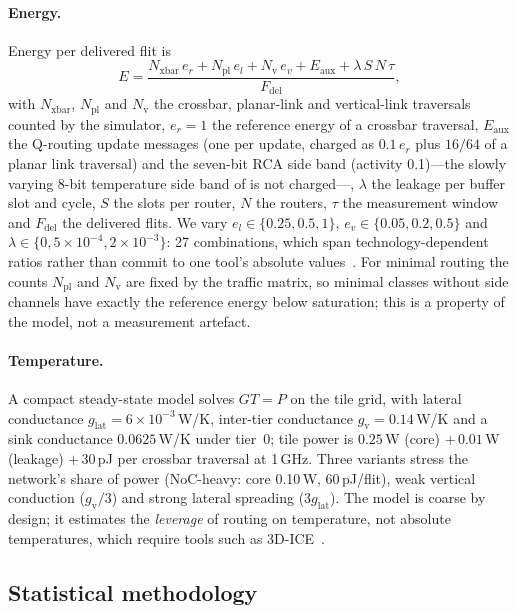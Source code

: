 \paragraph{Energy.} Energy per delivered flit is
\begin{equation}\label{eq:energy}
E=\frac{N_{\mathrm{xbar}}\,e_r+N_{\mathrm{pl}}\,e_l+N_{\mathrm{v}}\,e_v+E_{\mathrm{aux}}+\lambda\,S\,N\,\tau}{F_{\mathrm{del}}},
\end{equation}
with $N_{\mathrm{xbar}}$, $N_{\mathrm{pl}}$ and $N_{\mathrm{v}}$ the crossbar, planar-link and vertical-link traversals counted by the simulator, $e_r=1$ the reference energy of a crossbar traversal, $E_{\mathrm{aux}}$ the Q-routing update messages (one per update, charged as $0.1\,e_r$ plus $16/64$ of a planar link traversal) and the seven-bit RCA side band (activity 0.1)---the slowly varying 8-bit temperature side band of  is not charged---, $\lambda$ the leakage per buffer slot and cycle, $S$ the slots per router, $N$ the routers, $\tau$ the measurement window and $F_{\mathrm{del}}$ the delivered flits. We vary $e_l\in\{0.25,0.5,1\}$, $e_v\in\{0.05,0.2,0.5\}$ and $\lambda\in\{0,5\times10^{-4},2\times10^{-3}\}$: 27 combinations, which span technology-dependent ratios rather than commit to one tool's absolute values~\cite{sun2012dsent}. For minimal routing the counts $N_{\mathrm{pl}}$ and $N_{\mathrm{v}}$ are fixed by the traffic matrix, so minimal classes without side channels have exactly the reference energy below saturation; this is a property of the model, not a measurement artefact.

\paragraph{Temperature.} A compact steady-state model solves $GT=P$ on the tile grid, with lateral conductance $g_{\mathrm{lat}}=6\times10^{-3}$\,W/K, inter-tier conductance $g_{\mathrm{v}}=0.14$\,W/K and a sink conductance $0.0625$\,W/K under tier~0; tile power is $0.25$\,W (core) $+\,0.01$\,W (leakage) $+\,30$\,pJ per crossbar traversal at 1\,GHz. Three variants stress the network's share of power (NoC-heavy: core 0.10\,W, 60\,pJ/flit), weak vertical conduction ($g_{\mathrm{v}}/3$) and strong lateral spreading ($3g_{\mathrm{lat}}$). The model is coarse by design; it estimates the \emph{leverage} of routing on temperature, not absolute temperatures, which require tools such as 3D-ICE~\cite{sridhar2010ice}.

\subsection{Statistical methodology}
\label{sec:stats}

